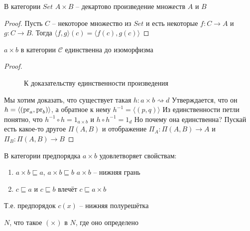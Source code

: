 \begin{stmt}
  В категории $Set$ $A \times B$ -- декартово произведение множеств $A$ и $B$
\end{stmt}
\begin{proof}
  Пусть $C$ -- некоторое множество из $Set$ и есть некоторые $f \colon C \to A$ и
  $g \colon C \to B$. Тогда $\langle f, g \rangle (c) = \langle f(c), g(c) \rangle$
\end{proof}

\begin{stmt}
  $a \times b$ в категории $\mathcal{C}$ единственна до изоморфизма
\end{stmt}
\begin{proof}
  \begin{figure}[h]
    \centering
    \caption{К доказательству единственности произведения}
    \label{fig:multiplication-uniqueness}
  \end{figure}
  Мы хотим доказать, что существует такая $h \colon a \times b \rightsquigarrow d$
  Утверждается, что он $h = \langle (\operatorname{pr}_a, \operatorname{pr}_b) \rangle$, а обратное к нему $h^{-1}
  = \langle (p, q) \rangle$
  Из единственности петли понятно, что $h^{-1} \circ h = 1_{a \times b}$ и $h
  \circ h^{-1} = 1_d$
  Но почему она единственна? Пускай есть какое-то другое $\Pi(A, B)$ и отображение
  $\Pi_A \colon \Pi(A, B) \to A$ и $\Pi_B \colon \Pi(A, B) \to B$
\end{proof}

\begin{task}
  В категории предпорядка
  $a \times b$ удовлетворяет свойствам:
  \begin{enumerate}
  \item $a \times b \sqsubseteq a$, $a \times b \sqsubseteq b$
      $a \times b$ -- нижняя грань
    \item $c \sqsubseteq a$ и $c \sqsubseteq b$ влечёт $c \sqsubseteq a \times b$
  \end{enumerate}
  Т.е. предпорядок $c (x)$ -- нижняя полурешётка
\end{task}

\begin{task}
  $N$, что такое $(\times)$ в $N$, где оно определено
\end{task}

